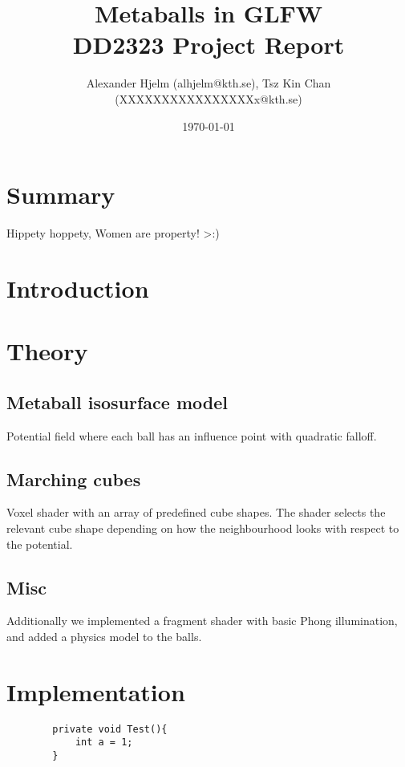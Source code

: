 \documentclass{article}
\begin{document}
    \title{%
      Metaballs in GLFW \\
      \large DD2323 Project Report \\}

    \author{Alexander Hjelm (alhjelm@kth.se), Tsz Kin Chan (XXXXXXXXXXXXXXXXx@kth.se)}

    \date{\today}

    \maketitle


    \section{Summary}
    Hippety hoppety, Women are property! >:)
    
    \section{Introduction}
    

    \section{Theory}

    \subsection{Metaball isosurface model}
    Potential field where each ball has an influence point with quadratic falloff.

    \subsection{Marching cubes}
    Voxel shader with an array of predefined cube shapes. The shader selects the relevant cube shape depending on how the neighbourhood looks with respect to the potential.
    
    \subsection{Misc}
    Additionally we implemented a fragment shader with basic Phong illumination, and added a physics model to the balls.

    \section{Implementation}
        \begin{lstlisting}
        private void Test(){
            int a = 1;
        }
        \end{lstlisting}
\end{document}
